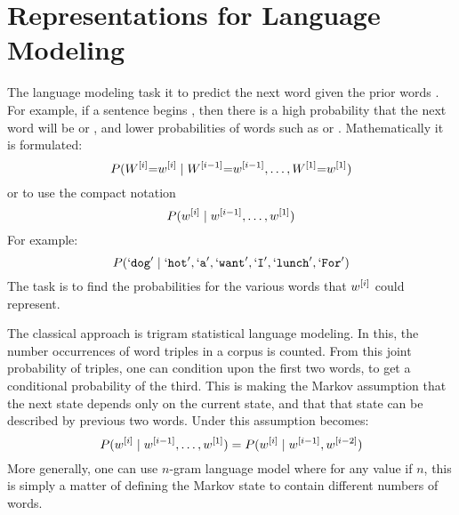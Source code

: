 \documentclass[parskip]{komatufte}
\begin{document}
\section{Representations for Language Modeling}


The language modeling task it to predict the next word given the prior words .
For example, if a sentence begins , then there is a high probability that the next word will be  or ,
and lower probabilities of words such as  or .
Mathematically it is formulated: 
\begin{equation}\label{equ:langmodel}
	P(\n W_i{=}\n w_i \mid \n W_{i-1}{=}\n w_{i-1}, \ldots, \n W_1{=}\n w_1)
\end{equation}
or to use the compact notation 
\begin{equation}\label{equ:langmodelcompact}
P(\n w_i \mid \n w_{i-1}, \ldots, \n w_1)
\end{equation}
For example: 
\begin{equation*}
P(`\texttt{dog}' \mid `\texttt{hot}', `\texttt{a}', `\texttt{want}', `\texttt{I}', `\texttt{lunch}', `\texttt{For}')
\end{equation*}
The task is to find the probabilities for the various words that $\n w_i$ could represent.


  
The classical approach is trigram statistical language modeling.
In this, the number occurrences of word triples in a corpus is counted.
From this joint probability of triples, one can condition upon the first two words,
to get a conditional probability of the third.
This is making the Markov assumption that the next state depends only on the current state,
and that that state can be described by previous two words.
Under this assumption  becomes:
\begin{equation}\label{equ:trigramlangmodel}
P(\n w_i \mid \n w_{i-1}, \ldots, \n w_1) = P(\n w_i \mid \n w_{i-1}, \n w_{i-2})
\end{equation}
More generally, one can use $n$-gram language model where for any value if $n$,
this is simply a matter of defining the Markov state to contain different numbers of words.
\end{document}
